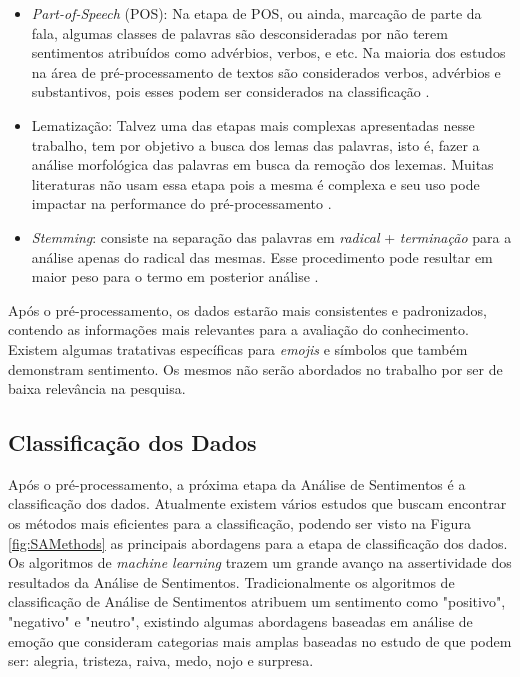 \begin{itemize}
\item \textit{Part-of-Speech} (POS): Na etapa de POS, ou ainda, marcação de parte da fala, algumas classes de palavras são desconsideradas por não terem sentimentos atribuídos como advérbios, verbos, e etc. Na maioria dos estudos na área de pré-processamento de textos são considerados verbos, advérbios e substantivos, pois esses podem ser considerados na classificação \cite{Barbosa:2010:RSD:1944566.1944571}.

\item Lematização: Talvez uma das etapas mais complexas apresentadas nesse trabalho, tem por objetivo a busca dos lemas das palavras, isto é, fazer a análise morfológica das palavras em busca da remoção dos lexemas. Muitas literaturas não usam essa etapa pois a mesma é complexa e seu uso pode impactar na performance do pré-processamento \cite{Guzman2014}.

\item \textit{Stemming}: consiste na separação das palavras em \textit{radical} + \textit{terminação} para a análise apenas do radical das mesmas. Esse procedimento pode resultar em maior peso para o termo em posterior análise \cite{Porter1980}.
\end{itemize}

Após o pré-processamento, os dados estarão mais consistentes e padronizados, contendo as informações mais relevantes para a avaliação do conhecimento. Existem algumas tratativas específicas para \textit{emojis} e símbolos que também demonstram sentimento. Os mesmos não serão abordados no trabalho por ser de baixa relevância na pesquisa.

\subsection{Classificação dos Dados}
Após o pré-processamento, a próxima etapa da Análise de Sentimentos é a classificação dos dados. Atualmente existem vários estudos que buscam encontrar os métodos mais eficientes para a classificação, podendo ser visto na Figura \ref{fig:SAMethods} as principais abordagens para a etapa de classificação dos dados. Os algoritmos de \textit{machine learning} trazem um grande avanço na assertividade dos resultados da Análise de Sentimentos. Tradicionalmente os algoritmos de classificação de Análise de Sentimentos atribuem um sentimento como "positivo", "negativo" e "neutro", existindo algumas abordagens baseadas em análise de emoção que consideram categorias mais amplas baseadas no estudo de  que podem ser: alegria, tristeza, raiva, medo, nojo e surpresa.  

